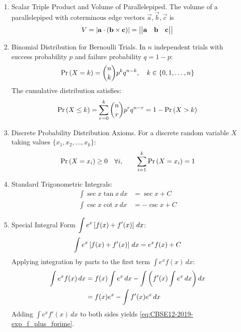 \begin{enumerate}[label=\thesubsection.\arabic*, ref=\thesubsection.\theenumi]
		\item Scalar Triple Product and Volume of Parallelepiped.
		The volume of a parallelepiped with coterminous edge vectors $\vec{a}, \vec{b}, \vec{c}$ is
		\begin{align}
			V = \left\vert\mathbf{a} \cdot \left(\mathbf{b} \times \mathbf{c}\right)\right\vert = \left\vert\begin{vmatrix}\mathbf{a} & \mathbf{b} & \mathbf{c}\end{vmatrix}\right\vert \label{eq:CBSE12-2019-scalar_triple_vol}
		\end{align}
		
		\item Binomial Distribution for Bernoulli Trials.
		In $n$ independent trials with success probability $p$ and failure probability $q = 1 - p$:
		\begin{align}
			\Pr\left(X = k\right) = \binom{n}{k} p^k q^{n-k}, \quad k \in \{0, 1, \dots, n\} \label{eq:CBSE12-2019-binomial_pmf}
		\end{align}
		The cumulative distribution satisfies:
		\begin{align}
			\Pr\left(X \le k\right) = \sum_{r=0}^k \binom{n}{r} p^r q^{n-r} = 1 - \Pr\left(X > k\right) \label{eq:CBSE12-2019-binomial_cdf}
		\end{align}
		
		\item Discrete Probability Distribution Axioms.
		For a discrete random variable $X$ taking values $\{x_1, x_2, \dots, x_k\}$:
		\begin{align}
			\Pr\left(X = x_i\right) \ge 0 \quad \forall i, \qquad \sum_{i=1}^k \Pr\left(X = x_i\right) = 1 \label{eq:CBSE12-2019-prob_dist_axioms}
		\end{align}
		
		\item Standard Trigonometric Integrals:
		\begin{align}
			\int \sec x \tan x \, dx &= \sec x + C \label{eq:CBSE12-2019-int_sec_tan} \\
			\int \csc x \cot x \, dx &= -\csc x + C \label{eq:CBSE12-2019-int_csc_cot}
		\end{align}
		
		\item Special Integral Form $\displaystyle\int e^x {}\left[f(x) + f'(x)\right] \, dx$:
		\begin{align}
			\int e^x {}\left[f(x) + f'(x)\right] \, dx = e^x f(x) + C \label{eq:CBSE12-2019-exp_f_plus_fprime}
		\end{align}
		\solution
		Applying integration by parts to the first term $\int e^x f(x) \, dx$:
		\begin{align}
			\int e^x f(x) \, dx &= f(x) \int e^x \, dx - \int \left(f'(x) \int e^x \, dx\right) dx \\
			&= f(x) e^x - \int f'(x) e^x \, dx
		\end{align}
		Adding $\int e^x f'(x) \, dx$ to both sides yields \eqref{eq:CBSE12-2019-exp_f_plus_fprime}.
		

\end{enumerate}
